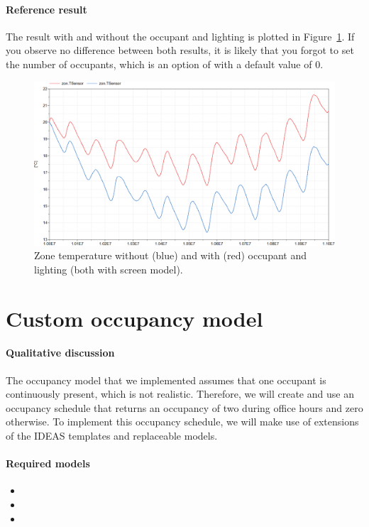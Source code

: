 \documentclass[10pt,a4paper]{article}
\begin{document}
\paragraph{Reference result}
The result with and without the occupant and lighting
is plotted in Figure~\ref{fig:res3}.
If you observe no difference between both results, 
it is likely that you forgot to set the number of occupants,
which is an option of 
with a default value of 0.

\begin{figure}[h!]
\centering
\includegraphics[scale=0.65]{Example3.png}
\caption{Zone temperature without (blue) and with (red) occupant and lighting (both with screen model).}
\label{fig:res3}
\end{figure}

\newpage

\section{Custom occupancy model}
\paragraph{Qualitative discussion}
The occupancy model that we implemented assumes
that one occupant is continuously present,
which is not realistic. Therefore, we will create and use an occupancy schedule that returns an occupancy of two during
office hours and zero otherwise. To implement this occupancy schedule, we will make use of extensions of the IDEAS templates and replaceable models.

\paragraph{Required models}
\begin{itemize}
\item {}
\item {}
\item {}
\end{itemize}
\end{document}
